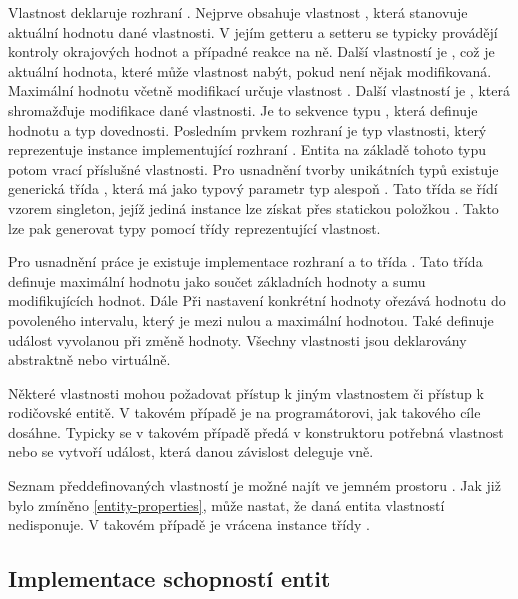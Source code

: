 Vlastnost deklaruje rozhraní . Nejprve obsahuje vlastnost , která stanovuje aktuální hodnotu
dané vlastnosti. V jejím getteru a setteru se typicky provádějí kontroly okrajových hodnot a případné reakce na ně. 
Další vlastností je , což je aktuální hodnota, které může vlastnost nabýt, pokud není nějak modifikovaná.
Maximální hodnotu včetně modifikací určuje vlastnost . Další vlastností je , která shromažďuje
modifikace dané vlastnosti. Je to sekvence typu , která definuje hodnotu a typ dovednosti. Posledním
prvkem rozhraní je typ vlastnosti, který reprezentuje instance implementující rozhraní .
Entita na základě tohoto typu potom vrací příslušné vlastnosti. 
Pro usnadnění tvorby unikátních typů existuje generická třída , která má jako typový parametr typ alespoň .
Tato třída se řídí vzorem singleton, jejíž jediná instance lze získat přes statickou položkou . Takto lze pak 
generovat typy pomocí třídy reprezentující vlastnost.

Pro usnadnění práce je existuje implementace rozhraní  a to třída . Tato třída definuje 
maximální hodnotu jako součet základních hodnoty a sumu modifikujících hodnot. Dále Při nastavení konkrétní hodnoty ořezává
hodnotu do povoleného intervalu, který je mezi nulou a maximální hodnotou. Také definuje událost vyvolanou při změně hodnoty.
Všechny vlastnosti jsou deklarovány abstraktně nebo virtuálně. 

 Některé vlastnosti mohou požadovat přístup k jiným vlastnostem či přístup k rodičovské entitě. V takovém
 případě je na programátorovi, jak takového cíle dosáhne. Typicky se v takovém případě předá v konstruktoru
 potřebná vlastnost nebo se vytvoří událost, která danou závislost deleguje vně. 

 Seznam předdefinovaných vlastností je možné najít ve jemném prostoru .
 Jak již bylo zmíněno \vref{entity-properties}, může nastat, že daná entita vlastností nedisponuje. V takovém případě 
 je vrácena instance třídy . 

\subsection{Implementace schopností entit}

